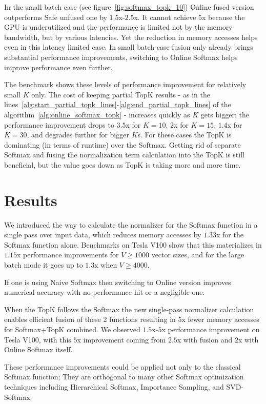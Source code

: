 \documentclass{article}
\begin{document}
In the small batch case (see figure~\ref{fig:softmax_topk_10}) Online fused version outperforms Safe unfused one by $1.5$x-$2.5$x. It cannot achieve $5$x because the GPU is underutilized and the performance is limited not by the memory bandwidth, but by various latencies. Yet the reduction in memory accesses helps even in this latency limited case. In small batch case fusion only already brings substantial performance improvements, switching to Online Softmax helps improve performance even further.

The benchmark shows these levels of performance improvement for relatively small $K$ only. The cost of keeping partial TopK results - as in the lines~\ref{alg:start_partial_topk_lines}-\ref{alg:end_partial_topk_lines} of the algorithm~\ref{alg:online_softmax_topk} - increases quickly as $K$ gets bigger: the performance improvement drops to $3.5$x for $K=10$, $2$x for $K=15$, $1.4$x for $K=30$, and degrades further for bigger $K$s. For these cases the TopK is dominating (in terms of runtime) over the Softmax. Getting rid of separate Softmax and fusing the normalization term calculation into the TopK is still beneficial, but the value goes down as TopK is taking more and more time.

\section{Results}

We introduced the way to calculate the normalizer for the Softmax function in a single pass over input data, which reduces memory accesses by $1.33$x for the Softmax function alone. Benchmarks on Tesla V100 show that this materializes in $1.15$x performance improvements for $V\geq 1000$ vector sizes, and for the large batch mode it goes up to $1.3$x when $V\geq 4000$.

If one is using Naive Softmax then switching to Online version improves numerical accuracy with no performance hit or a negligible one.

When the TopK follows the Softmax the new single-pass normalizer calculation enables efficient fusion of these 2 functions resulting in $5$x fewer memory accesses for Softmax+TopK combined. We observed $1.5$x-$5$x performance improvement on Tesla V100, with this $5$x improvement coming from $2.5$x with fusion and $2$x with Online Softmax itself.

These performance improvements could be applied not only to the classical Softmax function; They are orthogonal to many other Softmax optimization techniques including Hierarchical Softmax, Importance Sampling, and SVD-Softmax.
\end{document}
